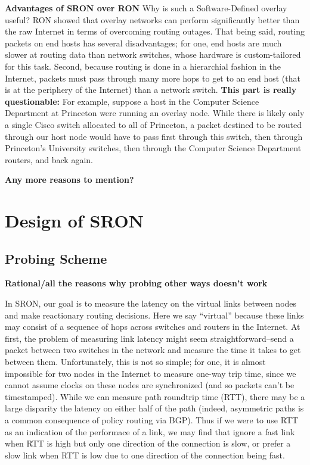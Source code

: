\documentclass[pageno]{jpaper}
\begin{document}
{\bf Advantages of SRON over RON}
Why is such a Software-Defined overlay useful? RON\cite{ron} showed that overlay networks can 
perform significantly better than the raw Internet in terms of overcoming routing outages. That 
being said, routing packets on end hosts has several disadvantages; for one, end hosts are 
much slower at routing data than network switches, whose hardware is custom-tailored for this task.
Second, because routing is done in a hierarchial fashion in the Internet, packets must pass 
through many more hops to get to an end host (that is at the periphery of the Internet) than a 
network switch.
{\bf This part is really questionable:} 
For example, suppose a host in the Computer Science Department at Princeton 
were running an overlay node. While there is likely only a single Cisco switch allocated to all of 
Princeton, a packet destined to be routed through our host node would have to pass first through this 
switch, then through Princeton's University switches, then through the Computer Science Department
routers, and back again.

{\bf Any more reasons to mention?} 

\section{Design of SRON}

\subsection{Probing Scheme}

{\bf Rational/all the reasons why probing other ways doesn't work}\bigskip

In SRON, our goal is to measure the latency on the virtual links between nodes and make reactionary
routing decisions. Here we say ``virtual'' because these links may consist of a sequence of hops
across switches and routers in the Internet. At first, the problem of measuring link latency 
might seem straightforward--send a packet between two switches in the network and measure the time
it takes to get between them. Unfortunately, this is not so simple; for one, it is almost impossible
for two nodes in the Internet to measure one-way trip time, since we cannot assume clocks on these
nodes are synchronized (and so packets can't be timestamped). While we can measure path roundtrip 
time (RTT), there may be a large disparity the latency on either half of the path (indeed, asymmetric
paths is a common consequence of policy routing via BGP). Thus if we were to use RTT as an indication 
of the performace of a link, we may find that ignore a fast link when RTT is high but only one direction
of the connection is slow, or prefer a slow link when RTT is low due to one direction of the connection
being fast. 
\end{document}
